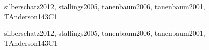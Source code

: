 \begin{syllabus}
\begin{unit}{\OSFaultTolerance}{}{silberschatz2012, stallings2005, tanenbaum2006, tanenbaum2001, TAnderson14}{3}{C1}
\begin{topics}
      \item \OSFaultToleranceTopicFundamental
      \item \OSFaultToleranceTopicSpatial
      \item \OSFaultToleranceTopicMethods
      \item \OSFaultToleranceTopicExamples
\end{topics}
\begin{learningoutcomes}
	\item \OSFaultToleranceLOExplainTheTheTolerance [\Familiarity]
	\item \OSFaultToleranceLOOutlineThe [\Familiarity]
	\item \OSFaultToleranceLOExplainHowSystem [\Familiarity]
\end{learningoutcomes}
\end{unit}

\begin{unit}{\OSSystemPerformanceEvaluation}{}{silberschatz2012, stallings2005, tanenbaum2006, tanenbaum2001, TAnderson14}{3}{C1}
\begin{topics}
      \item \OSSystemPerformanceEvaluationTopicWhy
      \item \OSSystemPerformanceEvaluationTopicWhat
      \item \OSSystemPerformanceEvaluationTopicSystems
      \item \OSSystemPerformanceEvaluationTopicEvaluation
      \item \OSSystemPerformanceEvaluationTopicHow
\end{topics}
\begin{learningoutcomes}
	\item \OSSystemPerformanceEvaluationLODescribeTheUsedHow [\Familiarity]
	\item \OSSystemPerformanceEvaluationLOExplainTheModels [\Familiarity]
\end{learningoutcomes}
\end{unit}

\begin{coursebibliography}
\end{coursebibliography}

\end{syllabus}

